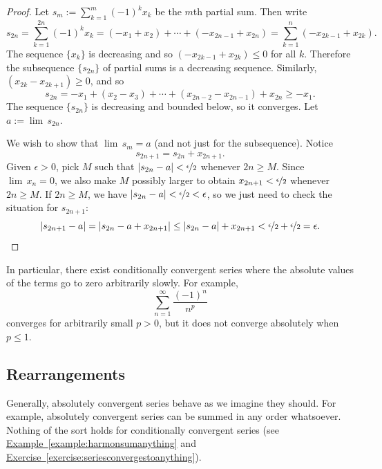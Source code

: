 \documentclass[12pt]{book}
\newcommand{\abs}[1]{\left\lvert {#1} \right\rvert}
\theoremstyle{plain}
\theoremstyle{remark}
\theoremstyle{definition}
\theoremstyle{exercise}
\theoremstyle{example}
\newcommand{\exerciseref}[1]{\hyperref[#1]{Exercise~\ref*{#1}}}
\newcommand{\exampleref}[1]{\hyperref[#1]{Example~\ref*{#1}}}
\begin{document}
\begin{proof}
Let $s_m := \sum_{k=1}^m {(-1)}^k x_k$ be the $m$th partial sum.  Then write
\begin{equation*}
s_{2n} =
\sum_{k=1}^{2n} {(-1)}^k x_k
=
(-x_1 + x_2) + \cdots + (-x_{2n-1} + x_{2n})
=
\sum_{k=1}^{n} (-x_{2k-1} + x_{2k}) .
\end{equation*}
The sequence $\{ x_k \}$ is decreasing and so $(-x_{2k-1}+x_{2k}) \leq 0$
for all $k$.
Therefore the subsequence $\{ s_{2n} \}$ of partial sums
is a decreasing sequence.  Similarly, $(x_{2k}-x_{2k+1}) \geq 0$, and so
\begin{equation*}
s_{2n} = - x_1 + ( x_2 - x_3 ) + \cdots + ( x_{2n-2} - x_{2n-1} ) + x_{2n}
\geq -x_1 .
\end{equation*}
The sequence $\{ s_{2n} \}$ is decreasing and bounded below, so it converges.
Let $a := \lim\, s_{2n}$.

We wish to show that $\lim\, s_m = a$ (and not just for the subsequence).
Notice
\begin{equation*}
s_{2n+1} = s_{2n} + x_{2n+1} .
\end{equation*}
Given $\epsilon > 0$, pick $M$ such that $\abs{s_{2n}-a} <
\nicefrac{\epsilon}{2}$ whenever $2n \geq M$.
Since $\lim\, x_n = 0$, we also
make $M$ possibly larger
to obtain
$x_{2n+1} < \nicefrac{\epsilon}{2}$ whenever $2n \geq M$.  
If $2n \geq M$, we have
$\abs{s_{2n}-a} < \nicefrac{\epsilon}{2} < \epsilon$, so we just need
to check the situation for $s_{2n+1}$:
\begin{equation*}
\abs{s_{2n+1}-a} = 
\abs{s_{2n}-a + x_{2n+1}} \leq
\abs{s_{2n}-a} + x_{2n+1} < 
\nicefrac{\epsilon}{2}+ \nicefrac{\epsilon}{2} = \epsilon .  \qedhere
\end{equation*}
\end{proof}

In particular, there exist conditionally convergent series
where the absolute values of the terms go to zero arbitrarily slowly.
For example,
\begin{equation*}
\sum_{n=1}^\infty \frac{{(-1)}^n}{n^p}
\end{equation*}
converges for arbitrarily small $p > 0$, but it does not converge
absolutely when $p \leq 1$.

\subsection{Rearrangements}

Generally,
absolutely convergent series behave as we imagine they should.  For example,
absolutely convergent series can be summed in any order whatsoever.  Nothing
of the sort holds for conditionally convergent series
(see \exampleref{example:harmonsumanything}
and \exerciseref{exercise:seriesconvergestoanything}).
\end{document}
